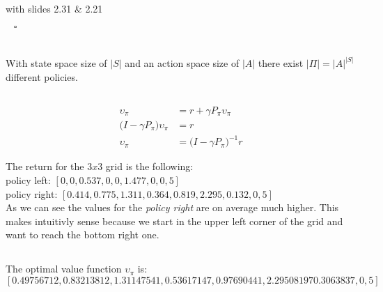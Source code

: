 \documentclass[11pt,a4paper]{article}
\begin{document}
\begin{flushright}
    \begin{footnotesize}
        with slides 2.31 \& 2.21 
    \end{footnotesize}
    $\;\;\;\square$
\end{flushright}




\section{}

\subsection{}

With state space size of $|S|$ and an action space size of $|A|$ there exist $|\Pi|=|A|^{|S|}$ different policies.


\subsection{}

\begin{align*}
    \upsilon_{\pi} & = r + \gamma P_{\pi} \upsilon_{\pi} \\
    \big( I - \gamma P_{\pi} \bigr)\upsilon_{\pi}        & = r \\
    \upsilon_{\pi} & = \big( I - \gamma P_{\pi} \bigr)^{-1}r
\end{align*}

\flushleft
The return for the $3x3$ grid is the following:\\
\vspace{5pt}
policy left: $[0, 0, 0.537, 0, 0, 1.477, 0, 0, 5]$\\
policy right: $[0.414, 0.775, 1.311, 0.364, 0.819,  2.295, 0.132, 0, 5]$\\
\vspace{10pt}
As we can see the values for the \textit{policy right} are on average much higher. This makes intuitivly sense because we
start in the upper left corner of the grid and want to reach the bottom right one.


\subsection{}

The optimal value function $\upsilon_{\pi}$ is: \\
$[0.49756712, 0.83213812, 1.31147541, 0.53617147, 0.97690441, 2.29508197
0.3063837, 0, 5]$
\end{document}
